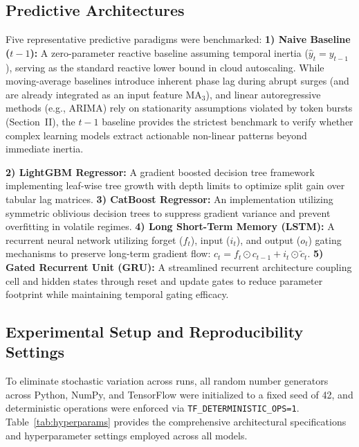 \documentclass[conference, a4paper]{IEEEtran}
\begin{document}
\subsection{Predictive Architectures}
Five representative predictive paradigms were benchmarked:
\textbf{1) Naive Baseline ($t-1$):} A zero-parameter reactive baseline assuming temporal inertia ($\hat{y}_{t} = y_{t-1}$), serving as the standard reactive lower bound in cloud autoscaling. While moving-average baselines introduce inherent phase lag during abrupt surges (and are already integrated as an input feature $\text{MA}_3$), and linear autoregressive methods (e.g., ARIMA) rely on stationarity assumptions violated by token bursts (Section~II), the $t-1$ baseline provides the strictest benchmark to verify whether complex learning models extract actionable non-linear patterns beyond immediate inertia.

\textbf{2) LightGBM Regressor:} A gradient boosted decision tree framework implementing leaf-wise tree growth with depth limits to optimize split gain over tabular lag matrices.
\textbf{3) CatBoost Regressor:} An implementation utilizing symmetric oblivious decision trees to suppress gradient variance and prevent overfitting in volatile regimes.
\textbf{4) Long Short-Term Memory (LSTM):} A recurrent neural network utilizing forget ($f_t$), input ($i_t$), and output ($o_t$) gating mechanisms to preserve long-term gradient flow: $c_t = f_t \odot c_{t-1} + i_t \odot \tilde{c}_t$.
\textbf{5) Gated Recurrent Unit (GRU):} A streamlined recurrent architecture coupling cell and hidden states through reset and update gates to reduce parameter footprint while maintaining temporal gating efficacy.


\subsection{Experimental Setup and Reproducibility Settings}
To eliminate stochastic variation across runs, all random number generators across Python, NumPy, and TensorFlow were initialized to a fixed seed of 42, and deterministic operations were enforced via \texttt{TF\_DETERMINISTIC\_OPS=1}. Table~\ref{tab:hyperparams} provides the comprehensive architectural specifications and hyperparameter settings employed across all models.
\end{document}
